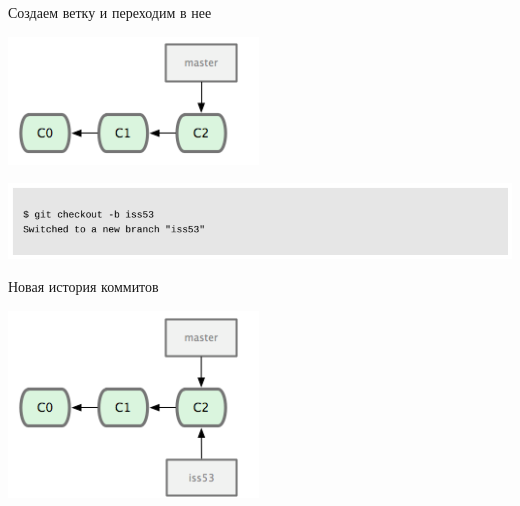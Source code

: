 \documentclass{beamer}
\begin{document}
\begin{frame}
\begin{block}{Создаем ветку и переходим в нее}
\begin{center}
\includegraphics[scale=0.5]{images/ex-03.png}
\end{center}
\end{block}
\begin{center}
\includegraphics[scale=0.5]{images/ex-04.png}
\end{center}
\begin{block}{Новая история коммитов}
\begin{center}
\includegraphics[scale=0.5]{images/ex-05.png}
\end{center}
\end{block}
\end{frame}
\end{document}

